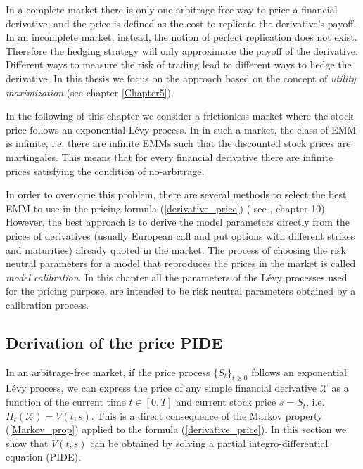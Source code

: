 In a complete market there is only one arbitrage-free way to price a financial derivative, and the price is defined as the cost to replicate the derivative's payoff.
In an incomplete market, instead, the notion of perfect replication does not exist. 
Therefore the hedging strategy will only approximate the payoff of the derivative. Different ways to measure the risk of trading lead to different 
ways to hedge the derivative. In this thesis we focus on the approach based on the concept of \emph{utility maximization} (see chapter \ref{Chapter5}).

In the following of this chapter we consider a frictionless market where the stock price follows an exponential Lévy process. 
In in such a market, the class of EMM is infinite, 
i.e. there are infinite EMMs such that the discounted stock prices are martingales.
This means that for every financial derivative there are infinite prices satisfying the condition of no-arbitrage. 

In order to overcome this problem, there are several methods to select the best EMM to use in the pricing formula (\ref{derivative_price}) (
see \cite{Cont}, chapter 10).
However, the best approach is to derive the model parameters directly from the prices of derivatives (usually European call and put options with different strikes and maturities) 
already quoted in the market.
The process of choosing the risk neutral parameters for a model that reproduces the prices in the market is called \emph{model calibration}.
In this chapter all the parameters of the Lévy processes used for the pricing purpose, are intended to be risk neutral parameters obtained by a calibration process.





\subsection{Derivation of the price PIDE}

In an arbitrage-free market, if the price process $\{S_t\}_{t\geq0}$ follows an exponential Lévy process, 
we can express the price of any simple financial derivative $\mathcal{X}$ as a function of the current time 
$t \in [0,T]$ and current stock price $s=S_t$, i.e. $\Pi_t(\mathcal{X}) = V(t,s)$.
This is a direct consequence of the Markov property (\ref{Markov_prop}) applied to the formula (\ref{derivative_price}).
In this section we show that $V(t,s)$ can be obtained by solving a partial integro-differential equation (PIDE).

